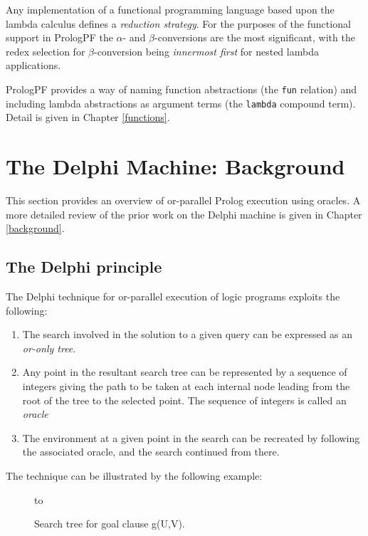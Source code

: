 Any implementation of a functional programming language based upon the lambda
calculus defines a \textit{reduction strategy}.  For the purposes of the
functional support in PrologPF the $\alpha$- and $\beta$-conversions are the
most significant, with the redex selection
for $\beta$-conversion being \textit{innermost first} for
nested lambda applications.

PrologPF provides a way of naming function abstractions (the \texttt{fun}
relation) and including lambda abstractions as argument terms (the 
\texttt{lambda} compound term).  Detail is given in Chapter \ref{functions}.

\section{The Delphi Machine: Background} %
\label{delphi_background}

This section provides an overview of or-parallel Prolog execution
using oracles.  A more detailed review of the prior work on the
Delphi machine is given in Chapter \ref{background}.

\subsection{The Delphi principle}

The Delphi technique for or-parallel execution of logic programs
exploits the following:
\begin{enumerate}
\item{The search involved in the solution to a given query can
  be expressed as an \textit{or-only tree}.}
\item{Any point in the resultant search tree can be represented by
  a sequence of integers giving the path to be taken at each internal
  node leading from the root of the tree to the selected point.
  The sequence of integers is called an \textit{oracle}}
\item{The environment at a given point in the search can be
  recreated by following the associated oracle, and the search continued
  from there.}
\end{enumerate}

The technique can be illustrated by the following example:

\begin{figure}[h]
\vspace{5mm} \hbox to 
\caption{Search tree for goal clause g(U,V).}
\vspace{5mm}
\label{and_or_tree}
\end{figure}

